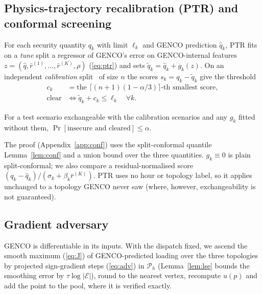 \subsection{Physics-trajectory recalibration (PTR) and conformal screening}
For each security quantity $q_k$ with limit $\ell_k$ and GENCO prediction $\hat q_k$, PTR
fits on a \emph{tune} split a regressor of GENCO's error on GENCO-internal features
$z=(\hat q,\bar r^{(1)},\dots,\bar r^{(K)},\rho)$ (\ref{eq:ptr}) and sets
$\tilde q_k=\hat q_k+g_k(z)$. On an independent \emph{calibration} split~\cite{lei2018} of
size $n$ the scores $s_k=q_k-\tilde q_k$ give the threshold
\begin{equation}
\begin{aligned}
c_k&=\text{the }\lceil(n+1)(1-\alpha/3)\rceil\text{-th smallest score},\\
\text{clear}&\iff\tilde q_k+c_k\le\ell_k\quad\forall k .
\end{aligned}
\label{eq:conf-short}
\end{equation}
\begin{theorem}\label{thm:main-conf}
For a test scenario exchangeable with the calibration scenarios and any $g_k$ fitted
without them, $\Pr[\text{insecure and cleared}]\le\alpha$.
\end{theorem}
The proof (Appendix~\ref{app:conf}) uses the split-conformal quantile Lemma~\ref{lem:conf}
and a union bound over the three quantities. $g_k\equiv0$ is plain split-conformal; we
also compare a residual-normalised score $(q_k-\hat q_k)/(\sigma_k+\beta_k\bar r^{(K)})$. PTR
uses no hour or topology label, so it applies unchanged to a topology GENCO never saw
(where, however, exchangeability is not guaranteed).

\subsection{Gradient adversary}
GENCO is differentiable in its inputs. With the dispatch fixed, we ascend the smooth
maximum (\ref{eq:J}) of GENCO-predicted loading over the three topologies by projected
sign-gradient steps (\ref{eq:adv}) in $\mathcal P_h$ (Lemma~\ref{lem:lse} bounds the
smoothing error by $\tau\log|\mathcal E|$), round to the nearest vertex, recompute $u(p)$ and
add the point to the pool, where it is verified exactly.

